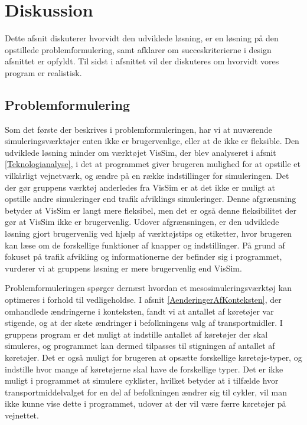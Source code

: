 \section{Diskussion}



Dette afsnit diskuterer hvorvidt den udviklede løsning, er en løsning på den opstillede problemformulering, samt afklarer om succeskriterierne i design afsnittet er opfyldt. Til sidst i afsnittet vil der diskuteres om hvorvidt vores program er realistisk.

\subsection{Problemformulering}
Som det første der beskrives i problemformuleringen, har vi at nuværende simuleringsværktøjer enten ikke er brugervenlige, eller at de ikke er fleksible. Den udviklede løsning minder om værktøjet VisSim, der blev analyseret i afsnit \ref{Teknologianalyse}, i det at programmet giver brugeren mulighed for at opstille et vilkårligt vejnetværk, og ændre på en række indstillinger for simuleringen. Det der gør gruppens værktøj anderledes fra VisSim er at det ikke er muligt at opstille andre simuleringer end trafik afviklings simuleringer. Denne afgrænsning betyder at VisSim er langt mere fleksibel, men det er også denne fleksibilitet der gør at VisSim ikke er brugervenlig. Udover afgrænsningen, er den udviklede løsning gjort brugervenlig ved hjælp af værktøjstips og etiketter, hvor brugeren kan læse om de forskellige funktioner af knapper og indstillinger. På grund af fokuset på trafik afvikling og informationerne der befinder sig i programmet, vurderer vi at gruppens løsning er mere brugervenlig end VisSim.

\vspace{5mm}
Problemformuleringen spørger dernæst hvordan et mesosimuleringsværktøj kan optimeres i forhold til vedligeholdse. I afsnit \ref{AenderingerAfKonteksten}, der omhandlede ændringerne i konteksten, fandt vi at antallet af køretøjer var stigende, og at der skete ændringer i befolkningens valg af transportmidler. I gruppens program er det muligt at indstille antallet af køretøjer der skal simuleres, og programmet kan dermed tilpasses til stigningen af antallet af køretøjer. Det er også muligt for brugeren at opsætte forskellige køretøjs-typer, og indstille hvor mange af køretøjerne skal have de forskellige typer. Det er ikke muligt i programmet at simulere cyklister, hvilket betyder at i tilfælde hvor transportmiddelvalget for en del af befolkningen ændrer sig til cykler, vil man ikke kunne vise dette i programmet, udover at der vil være færre køretøjer på vejnettet. 

